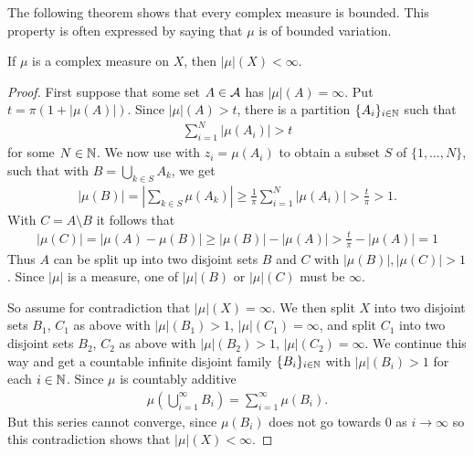 \documentclass[../../main.tex]{subfiles}
\begin{document}
The following theorem shows that every complex measure is bounded. This property is often expressed by saying that $\mu$ is of bounded variation.

\begin{theorem}\label{thm: total variation is finite}
If $\mu$ is a complex measure on $X$, then $|\mu|(X)<\infty$.
\end{theorem}
\begin{proof}
First suppose that some set $A\in \mathcal{A}$ has $|\mu|(A)=\infty$. Put $t=\pi(1+|\mu(A)|)$. Since $|\mu|(A)>t$, there is a partition $\{A_{i}\}_{i\in \mathbb{N}}$ such that
\begin{align*}
	\sum_{i=1}^{N}|\mu(A_{i})| > t
\end{align*}
for some $N\in \mathbb{N}$. We now use  with $z_{i}=\mu(A_{i})$ to obtain a subset $S$ of $\{1, \dots, N\}$, such that with $B=\bigcup_{k\in S}A_{k}$, we get
\begin{align*}
	|\mu(B)| = \left| \sum_{k\in S} \mu(A_{k}) \right| \ge \frac{1}{\pi} \sum_{i=1}^{N}|\mu(A_{i})| > \frac{t}{\pi} > 1.
\end{align*}
With $C=A\setminus B$ it follows that
\begin{align*}
	|\mu(C)|=|\mu(A)-\mu(B)| \ge |\mu(B)| - |\mu(A)| > \frac{t}{\pi} - |\mu(A)| = 1
\end{align*}
Thus $A$ can be split up into two disjoint sets $B$ and $C$ with $|\mu(B)|, |\mu(C)|>1$. Since $|\mu|$ is a measure, one of $|\mu|(B)$ or $|\mu|(C)$ must be $\infty$.

So assume for contradiction that $|\mu|(X)=\infty$. We then split $X$ into two disjoint sets $B_{1}$, $C_{1}$ as above with $|\mu|(B_{1})>1$, $|\mu|(C_{1})=\infty$, and split $C_{1}$ into two disjoint sets $B_{2}$, $C_{2}$ as above with $|\mu|(B_{2})>1$, $|\mu|(C_{2})=\infty$. We continue this way and get a countable infinite disjoint family $\{B_{i}\}_{i\in \mathbb{N}}$ with $|\mu|(B_{i})>1$ for each $i\in \mathbb{N}$. Since $\mu$ is countably additive
\begin{align*}
	\mu\left( \bigcup_{i=1}^{\infty} B_{i} \right) = \sum_{i=1}^{\infty} \mu(B_{i}).
\end{align*}
But this series cannot converge, since $\mu(B_{i})$ does not go towards $0$ as $i\to \infty$ so this contradiction shows that $|\mu|(X)<\infty$.
\end{proof}
\end{document}
